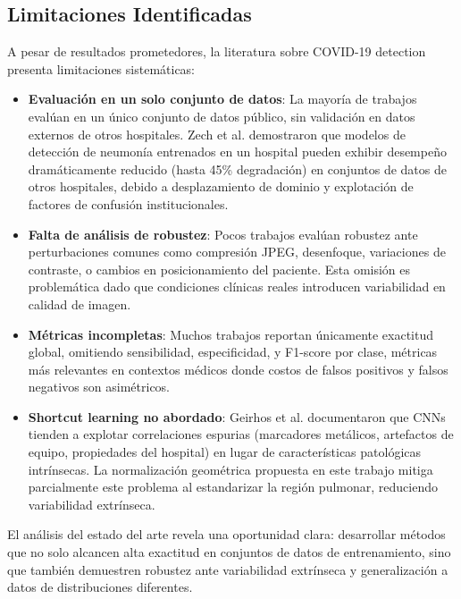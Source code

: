 \subsection{Limitaciones Identificadas}

A pesar de resultados prometedores, la literatura sobre COVID-19 detection presenta limitaciones sistemáticas:

\begin{itemize}
\item \textbf{Evaluación en un solo conjunto de datos}: La mayoría de trabajos evalúan en un único conjunto de datos público, sin validación en datos externos de otros hospitales. Zech et al. \cite{zech2018variable} demostraron que modelos de detección de neumonía entrenados en un hospital pueden exhibir desempeño dramáticamente reducido (hasta 45\% degradación) en conjuntos de datos de otros hospitales, debido a desplazamiento de dominio y explotación de factores de confusión institucionales.

\item \textbf{Falta de análisis de robustez}: Pocos trabajos evalúan robustez ante perturbaciones comunes como compresión JPEG, desenfoque, variaciones de contraste, o cambios en posicionamiento del paciente. Esta omisión es problemática dado que condiciones clínicas reales introducen variabilidad en calidad de imagen.

\item \textbf{Métricas incompletas}: Muchos trabajos reportan únicamente exactitud global, omitiendo sensibilidad, especificidad, y F1-score por clase, métricas más relevantes en contextos médicos donde costos de falsos positivos y falsos negativos son asimétricos.

\item \textbf{Shortcut learning no abordado}: Geirhos et al. \cite{geirhos2020shortcut} documentaron que CNNs tienden a explotar correlaciones espurias (marcadores metálicos, artefactos de equipo, propiedades del hospital) en lugar de características patológicas intrínsecas. La normalización geométrica propuesta en este trabajo mitiga parcialmente este problema al estandarizar la región pulmonar, reduciendo variabilidad extrínseca.
\end{itemize}

El análisis del estado del arte revela una oportunidad clara: desarrollar métodos que no solo alcancen alta exactitud en conjuntos de datos de entrenamiento, sino que también demuestren robustez ante variabilidad extrínseca y generalización a datos de distribuciones diferentes.


